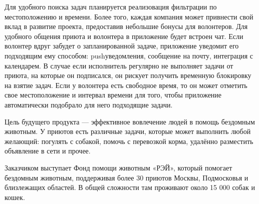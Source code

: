 \documentclass[12pt]{article}
\begin{document}
Для удобного поиска задач планируется реализовация фильтрации по местоположению и времени. Более того, каждая компания может привнести свой вклад в развитие проекта, предоставив небольшие бонусы для волонтеров. Для удобного общения приюта и волонтера в приложение будет встроен чат. Если волонтер вдруг забудет о запланированной задаче, приложение уведомит его подходящим ему способом: pushуведомления, сообщение на почту, интеграция с календарем. В случае если исполнитель регулярно не выполняет задачи от приюта, на которые он подписался, он рискует получить временную блокировку на взятие задач. Если у волонтера есть свободное время, то он может отметить свое местоположение и интервал времени для того, чтобы приложение автоматически подобрало для него подходящие задачи.

Цель будущего продукта --- эффективное вовлечение людей в помощь бездомным животным. У приютов есть различные задачи, которые может выполнить любой желающий: погулять с собакой, помочь с перевозкой корма, удалённо разместить объявление в сети и прочее.

Заказчиком выступает Фонд помощи животным «РЭЙ», который помогает бездомным животным, поддерживая более 30 приютов Москвы, Подмосковья и близлежащих областей. В общей сложности там проживают около 15 000 собак и кошек.
\newpage
\end{document}
